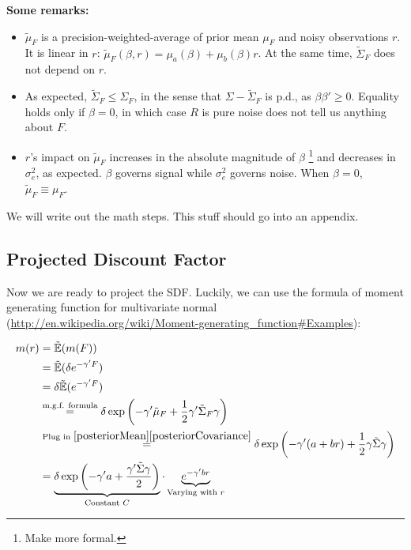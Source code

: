 \documentclass[pdftex,12pt,a4paper]{article}
\begin{document}
\textbf{Some remarks:}

\begin{itemize}
\item $\tilde{\mu}_F$ is a precision-weighted-average of prior mean $\mu_F$ and noisy observations $r$. It is linear in $r$: $\tilde{\mu}_F(\beta,r) = \mu_a(\beta) + \mu_b(\beta) r$. At the same time, $\tilde{\Sigma}_F$ does not depend on $r$. 
\item As expected, $\tilde{\Sigma}_F \le \Sigma_F$, in the sense that $\Sigma - \tilde{\Sigma}_F$ is p.d., as $\beta \beta' \ge 0$. Equality holds only if $\beta = 0$, in which case $R$ is pure noise does not tell us anything about $F$. 
\item $r$'s impact on $\tilde{\mu}_F$ increases in the absolute magnitude of $\beta$ \footnote{Make more formal.} and decreases in $\sigma^2_e$, as expected. $\beta$ governs signal while $\sigma_e^2$ governs noise. When $\beta = 0$, $\tilde{\mu}_F \equiv \mu_F$. 
\end{itemize}

We will write out the math steps. This stuff should go into an appendix. 

\subsection{Projected Discount Factor}

Now we are ready to project the SDF. Luckily, we can use the formula of moment generating function for multivariate normal (\url{http://en.wikipedia.org/wiki/Moment-generating_function#Examples}): 

\begin{align}
m(r) & = \tilde{\mathbb{E}}(m(F)) \\
& = \tilde{\mathbb{E}}(\delta e^{-\gamma' F}) \\
& = \delta \tilde{\mathbb{E}}(e^{-\gamma' F}) \\
& \stackrel{\text{m.g.f. formula}}{=} \delta \exp \left( - \gamma' \tilde{\mu}_F + \frac{1}{2} \gamma' \tilde{\Sigma}_F \gamma \right) \\
& \stackrel{\text{Plug in } \eqref{posteriorMean} \eqref{posteriorCovariance}}{=} \delta \exp \left( - \gamma' (a + br) + \frac{1}{2} \gamma \tilde{\Sigma} \gamma \right) \\
& = \underbrace{\delta \exp \left( - \gamma' a + \frac{\gamma' \tilde{\Sigma} \gamma }{2} \right)}_{\text{Constant }C} \cdot \underbrace{e ^ {- \gamma' b r}}_{\text{Varying with }r}
\end{align}
\end{document}
